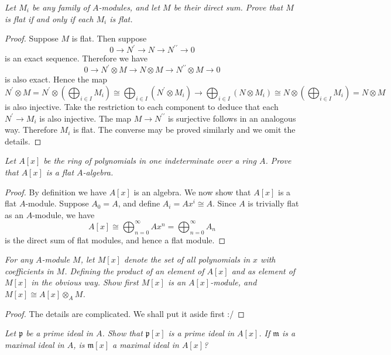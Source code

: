 \begin{problem}\em
Let $M_i$ be any family of $A$-modules, and let $M$ be their direct sum. Prove that $M$ is flat if and only if each $M_i$ is flat.
\end{problem}
\begin{proof}
Suppose $M$ is flat. Then suppose 
$$
0\longrightarrow N^{\prime}\longrightarrow N\longrightarrow N^{\prime\prime}\longrightarrow 0
$$
is an exact sequence. Therefore we have 
$$
0\longrightarrow N^{\prime}\otimes M\longrightarrow N\otimes M\longrightarrow N^{\prime\prime}\otimes M\longrightarrow 0
$$
is also exact. Hence the map 
$$
N^{\prime}\otimes M=N^{\prime}\otimes \left( \bigoplus_{i\in I}{M_i} \right) \cong \bigoplus_{i\in I}{\left( N^{\prime}\otimes M_i \right)}\rightarrow \bigoplus_{i\in I}{\left( N\otimes M_i \right)}\cong N\otimes \left( \bigoplus_{i\in I}{M_i} \right) =N\otimes M
$$
is also injective. Take the restriction to each component to deduce that each $N^\prime\to M_i$ is also injective. The map $M\to N^{\prime\prime}$ is surjective follows in an analogous way. Therefore $M_i$ is flat. The converse may be proved similarly and we omit the details.
\end{proof}
\begin{problem}\em
Let $A[x]$ be the ring of polynomials in one indeterminate over a ring $A$. Prove that $A[x]$ is a flat $A$-algebra.
\end{problem}
\begin{proof}
By definition we have $A[x]$ is an algebra. We now show that $A[x]$ is a flat $A$-module. Suppose $A_0=A$, and define $A_i=Ax^i\cong A$. Since $A$ is trivially flat as an $A$-module, we have 
$$
A\left[ x \right] \cong \bigoplus_{n=0}^{\infty}{Ax^n}=\bigoplus_{n=0}^{\infty}{A_n}
$$
is the direct sum of flat modules, and hence a flat module.
\end{proof}
\begin{problem}\em
For any $A$-module $M$, let $M[x]$ denote the set of all polynomials in $x$ with coefficients in $M$. Defining the product of an element of $A[x]$ and as element of $M[x]$ in the obvious way. Show first $M[x]$ is an $A[x]$-module, and $M[x]\cong A[x]\otimes_AM$.
\end{problem}
\begin{proof}
The details are complicated. We shall put it aside first :/
\end{proof}
\begin{problem}\em
Let $\mathfrak{p}$ be a prime ideal in $A$. Show that $\mathfrak{p}[x]$ is a prime ideal in $A[x]$. If $\mathfrak{m}$ is a maximal ideal in $A$, is $\mathfrak{m}[x]$ a maximal ideal in $A[x]$?
\end{problem}
